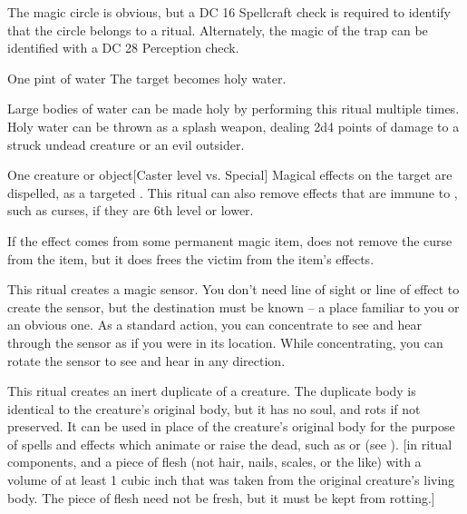 The magic circle is obvious, but a DC 16 Spellcraft check is required to identify that the circle belongs to a  ritual. Alternately, the magic of the trap can be identified with a DC 28 Perception check.

\begin{spelltarget}{One pint of water}
    \spelleffect The target becomes holy water.
\end{spelltarget}
\spellnotes Large bodies of water can be made holy by performing this ritual multiple times. Holy water can be thrown as a splash weapon, dealing 2d4 points of damage to a struck undead creature or an evil outsider.

\spellrng{\rngclose}
\begin{spelltarget}{One creature or object}[Caster level vs. Special]
    \spelleffect Magical effects on the target are dispelled, as a targeted . This ritual can also remove effects that are immune to , such as curses, if they are 6th level or lower.
\end{spelltarget}
\par If the effect comes from some permanent magic item,  does not remove the curse from the item, but it does frees the victim from the item's effects.

\spellrng{\rngext \rngunrestricted}
\spelldur{\durmed \dismissable}
\spellline
\spelleffect This ritual creates a magic sensor. You don't need line of sight or line of effect to create the sensor, but the destination must be known -- a place familiar to you or an obvious one. As a standard action, you can concentrate to see and hear through the sensor as if you were in its location. While concentrating, you can rotate the sensor to see and hear in any direction.
\spellnotes \sensorspellnotes
{}

\spelleffect This ritual creates an inert duplicate of a creature. The duplicate body is identical to the creature's original body, but it has no soul, and rots if not preserved. It can be used in place of the creature's original body for the purpose of spells and effects which animate or raise the dead, such as  or  (see ).
[in ritual components, and a piece of flesh (not hair, nails, scales, or the like) with a volume of at least 1 cubic inch that was taken from the original creature's living body. The piece of flesh need not be fresh, but it must be kept from rotting.]

